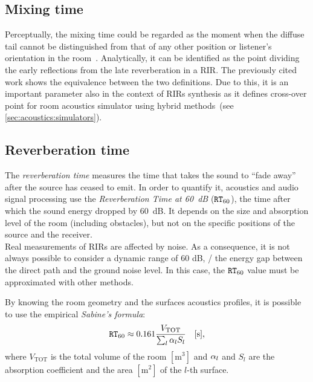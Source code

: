 \subsection{Mixing time}
Perceptually, the mixing time could be regarded as the moment when the diffuse tail cannot be distinguished from that of any other position or listener’s orientation in the room~.
Analytically, it can be identified as the point dividing the early reflections from the late reverberation in a \ac{RIR}.
The previously cited work shows the equivalence between the two definitions.
Due to this, it is an important parameter also in the context of \acp{RIR} synthesis as it defines cross-over point for room acoustics simulator using hybrid methods~(see \cref{sec:acoustics:simulators}).

\subsection{Reverberation time}
The \textit{reverberation time} measures the time that takes the sound to ``fade away'' after the source has ceased to emit.
In order to quantify it, acoustics and audio signal processing use the \textit{Reverberation Time at 60~dB} ($\mathtt{RT}_{60}$), the time after which the sound energy dropped by 60~dB.
It depends on the size and absorption level of the room (including obstacles), but not on the specific positions of the source and the receiver.
\\Real measurements of \acp{RIR} are affected by noise.
As a consequence, it is not always possible to consider a dynamic range of 60 dB,
\ie/ the energy gap between the direct path and the ground noise level.
In this case, the $\mathtt{RT}_{60}$ value must be approximated with other methods.

\noindent By knowing the room geometry and the surfaces acoustics profiles,
it is possible to use the empirical \textit{Sabine's formula}:
\begin{equation}\label{eq:processing:sabine}
    \mathtt{RT}_{60}
    \approx 0.161 \frac{V_{\text{TOT}}}{\sum_l \alpha_l S_l} \hspace{1em} [\si{\second}]
    ,
\end{equation}
where $V_{\text{TOT}}$ is the total volume of the room $[\si{\metre^3}]$ and $\alpha_l$ and $S_l$ are the
absorption coefficient and the area $[\si{\metre^2}]$  of the $l$-th surface.

